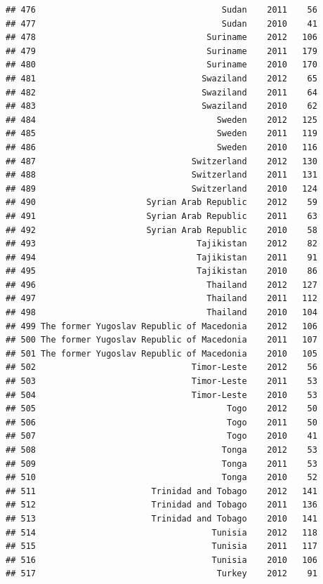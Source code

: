 \documentclass[
]{book}
\begin{document}
\begin{verbatim}
## 476                                     Sudan    2011    56
## 477                                     Sudan    2010    41
## 478                                  Suriname    2012   106
## 479                                  Suriname    2011   179
## 480                                  Suriname    2010   170
## 481                                 Swaziland    2012    65
## 482                                 Swaziland    2011    64
## 483                                 Swaziland    2010    62
## 484                                    Sweden    2012   125
## 485                                    Sweden    2011   119
## 486                                    Sweden    2010   116
## 487                               Switzerland    2012   130
## 488                               Switzerland    2011   131
## 489                               Switzerland    2010   124
## 490                      Syrian Arab Republic    2012    59
## 491                      Syrian Arab Republic    2011    63
## 492                      Syrian Arab Republic    2010    58
## 493                                Tajikistan    2012    82
## 494                                Tajikistan    2011    91
## 495                                Tajikistan    2010    86
## 496                                  Thailand    2012   127
## 497                                  Thailand    2011   112
## 498                                  Thailand    2010   104
## 499 The former Yugoslav Republic of Macedonia    2012   106
## 500 The former Yugoslav Republic of Macedonia    2011   107
## 501 The former Yugoslav Republic of Macedonia    2010   105
## 502                               Timor-Leste    2012    56
## 503                               Timor-Leste    2011    53
## 504                               Timor-Leste    2010    53
## 505                                      Togo    2012    50
## 506                                      Togo    2011    50
## 507                                      Togo    2010    41
## 508                                     Tonga    2012    53
## 509                                     Tonga    2011    53
## 510                                     Tonga    2010    52
## 511                       Trinidad and Tobago    2012   141
## 512                       Trinidad and Tobago    2011   136
## 513                       Trinidad and Tobago    2010   141
## 514                                   Tunisia    2012   118
## 515                                   Tunisia    2011   117
## 516                                   Tunisia    2010   106
## 517                                    Turkey    2012    91

\end{verbatim}
\end{document}

